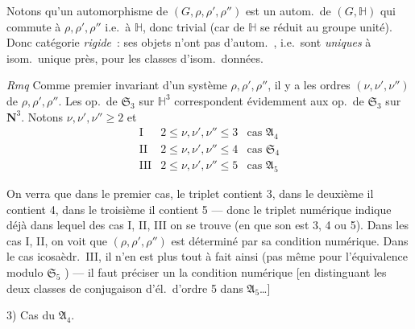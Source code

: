 \documentclass[11pt,a4paper]{article}
\begin{document}
Notons qu'un automorphisme de $(G, \rho, \rho', \rho'')$ est un autom.\ de
$(G, \mathbb{H})$ qui commute à $\rho, \rho', \rho''$ i.e.\ à $\mathbb{H}$, donc
 trivial (car  de $\mathbb{H}$ se réduit au
groupe unité). Donc  catégorie \emph{rigide}~: ses objets n'ont
pas d'autom.\ \ill{}, i.e.\ sont \emph{uniques} à isom.\ unique près, pour les
classes d'isom.\ données.

\emph{Rmq} Comme premier invariant d'un système $\rho, \rho', \rho''$, il y a
les  ordres $(\nu, \nu', \nu'')$ de $\rho, \rho', \rho''$.
 Les op.\ de $\mathfrak{S}_3$ sur $\mathbb{H}^3$ correspondent
évidemment aux op.\ de $\mathfrak{S}_3$ sur $\mathbf{N}^3$. Notons
$\nu, \nu', \nu'' \geq 2$ et
\[
\begin{array}{lll}
\mathrm{I} & 2 \leq \nu, \nu', \nu'' \leq 3 & \text{cas } \mathfrak{A}_4 \\
\mathrm{II} & 2 \leq \nu, \nu', \nu'' \leq 4 & \text{cas } \mathfrak{S}_4 \\
\mathrm{III} & 2 \leq \nu, \nu', \nu'' \leq 5 & \text{cas } \mathfrak{A}_5
\end{array}
\]

On verra que dans le premier cas, le triplet \struck{\ill{}} contient 3, dans
le deuxième il contient 4, dans le troisième il contient 5 --- donc le
triplet numérique indique déjà dans lequel des cas I, II, III on se
trouve (en  que son  est 3, 4 ou 5). Dans les
cas I, II, on voit que $(\rho, \rho', \rho'')$ est déterminé  par
sa condition numérique. Dans le cas icosaèdr.\ III, il n'en est plus tout à
fait ainsi (pas même pour l'équivalence modulo $\mathfrak{S}_5$
) --- il faut préciser un  la condition numérique [en
distinguant les deux classes de conjugaison d'él.\ d'ordre 5 dans
$\mathfrak{A}_5$\ldots]

3) Cas du $\mathfrak{A}_4$.
\end{document}
